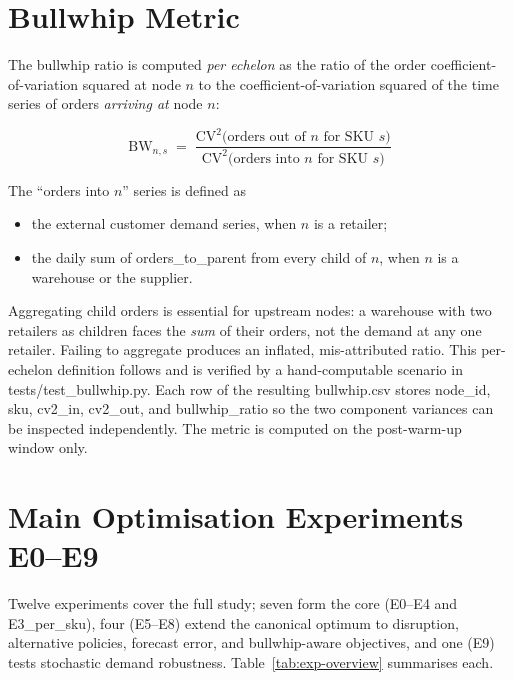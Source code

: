 \section{Bullwhip Metric}
\label{sec:meth:bullwhip}

The bullwhip ratio is computed \emph{per echelon} as the ratio of the
order coefficient-of-variation squared at node $n$ to the
coefficient-of-variation squared of the time series of orders
\emph{arriving at} node $n$:

\begin{equation}
  \text{BW}_{n,s} \;=\;
    \frac{\text{CV}^2\!\bigl(\text{orders out of } n \text{ for SKU } s\bigr)}
         {\text{CV}^2\!\bigl(\text{orders into } n \text{ for SKU } s\bigr)}
  \label{eq:bullwhip}
\end{equation}

The ``orders into $n$'' series is defined as
\begin{itemize}
  \item the external customer demand series, when $n$ is a retailer;
  \item the daily sum of orders\_to\_parent from every child of $n$,
        when $n$ is a warehouse or the supplier.
\end{itemize}

Aggregating child orders is essential for upstream nodes: a warehouse
with two retailers as children faces the \emph{sum} of their orders,
not the demand at any one retailer.  Failing to aggregate produces an
inflated, mis-attributed ratio.  This per-echelon definition follows
\citet{LeeEtAl1997} and is verified by a hand-computable scenario in
tests/test\_bullwhip.py.  Each row of the resulting
bullwhip.csv stores node\_id, sku,
cv2\_in, cv2\_out, and bullwhip\_ratio so the
two component variances can be inspected independently.  The metric is
computed on the post-warm-up window only.

\section{Main Optimisation Experiments E0--E9}
\label{sec:meth:main}

Twelve experiments cover the full study; seven form the core (E0--E4 and
E3\_per\_sku), four (E5--E8) extend the canonical optimum to
disruption, alternative policies, forecast error, and bullwhip-aware
objectives, and one (E9) tests stochastic demand robustness.
Table~\ref{tab:exp-overview} summarises each.


